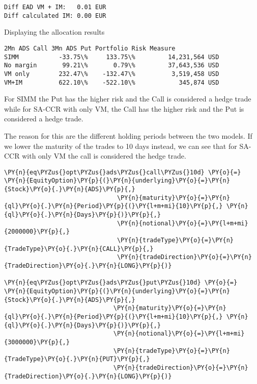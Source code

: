     \begin{Verbatim}[commandchars=\\\{\}]
Diff EAD VM + IM:   0.01 EUR
Diff calculated IM: 0.00 EUR
    \end{Verbatim}

    Displaying the allocation results

            \begin{tcolorbox}[breakable, size=fbox, boxrule=.5pt, pad at break*=1mm, opacityfill=0]
\begin{Verbatim}[commandchars=\\\{\}]
          2Mn ADS Call 3Mn ADS Put Portfolio Risk Measure
SIMM           -33.75\%     133.75\%         14,231,564 USD
No margin       99.21\%       0.79\%         37,643,536 USD
VM only        232.47\%    -132.47\%          3,519,458 USD
VM+IM          622.10\%    -522.10\%            345,874 USD
\end{Verbatim}
\end{tcolorbox}
        
    For SIMM the Put has the higher risk and the Call is considered a hedge
trade while for SA-CCR with only VM, the Call has the higher risk and
the Put is considered a hedge trade.

The reason for this are the different holding periods between the two
models. If we lower the maturity of the trades to 10 days instead, we
can see that for SA-CCR with only VM the call is considered the hedge
trade.

    \begin{tcolorbox}[breakable, size=fbox, boxrule=1pt, pad at break*=1mm,colback=cellbackground, colframe=cellborder]
\begin{Verbatim}[commandchars=\\\{\}]
\PY{n}{eq\PYZus{}opt\PYZus{}ads\PYZus{}call\PYZus{}10d} \PY{o}{=} \PY{n}{EquityOption}\PY{p}{(}\PY{n}{underlying}\PY{o}{=}\PY{n}{Stock}\PY{o}{.}\PY{n}{ADS}\PY{p}{,}
                               \PY{n}{maturity}\PY{o}{=}\PY{n}{ql}\PY{o}{.}\PY{n}{Period}\PY{p}{(}\PY{l+m+mi}{10}\PY{p}{,} \PY{n}{ql}\PY{o}{.}\PY{n}{Days}\PY{p}{)}\PY{p}{,}
                               \PY{n}{notional}\PY{o}{=}\PY{l+m+mi}{2000000}\PY{p}{,}
                               \PY{n}{tradeType}\PY{o}{=}\PY{n}{TradeType}\PY{o}{.}\PY{n}{CALL}\PY{p}{,}
                               \PY{n}{tradeDirection}\PY{o}{=}\PY{n}{TradeDirection}\PY{o}{.}\PY{n}{LONG}\PY{p}{)}

\PY{n}{eq\PYZus{}opt\PYZus{}ads\PYZus{}put\PYZus{}10d} \PY{o}{=} \PY{n}{EquityOption}\PY{p}{(}\PY{n}{underlying}\PY{o}{=}\PY{n}{Stock}\PY{o}{.}\PY{n}{ADS}\PY{p}{,}
                              \PY{n}{maturity}\PY{o}{=}\PY{n}{ql}\PY{o}{.}\PY{n}{Period}\PY{p}{(}\PY{l+m+mi}{10}\PY{p}{,} \PY{n}{ql}\PY{o}{.}\PY{n}{Days}\PY{p}{)}\PY{p}{,}
                              \PY{n}{notional}\PY{o}{=}\PY{l+m+mi}{3000000}\PY{p}{,}
                              \PY{n}{tradeType}\PY{o}{=}\PY{n}{TradeType}\PY{o}{.}\PY{n}{PUT}\PY{p}{,}
                              \PY{n}{tradeDirection}\PY{o}{=}\PY{n}{TradeDirection}\PY{o}{.}\PY{n}{LONG}\PY{p}{)}
\end{Verbatim}
\end{tcolorbox}

